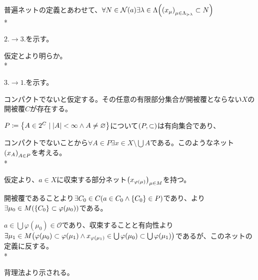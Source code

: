 {  普遍ネットの定義とあわせて、$\forall N \in \mathcal{N}(a) \exists \lambda \in \Lambda \qty(\qty(x_\mu)_{\mu \in \Lambda_{\succcurlyeq \lambda}} \subset N)$\\*

  $2. \rightarrow 3.$を示す。

  仮定とより明らか。\\*

  $3. \rightarrow 1.$を示す。

  コンパクトでないと仮定する。その任意の有限部分集合が開被覆とならない$X$の開被覆$C$が存在する。

  $P \coloneqq \qty{A \in 2^C \mid \abs{A} < \infty \land A \neq \varnothing}$について$\qty(P, \subset)$は有向集合であり、

  コンパクトでないことから$\forall A \in P \exists x \in X \setminus \bigcup A$である。このようなネット$\qty(x_A)_{A \in P}$を考える。\\*

  仮定より、$a \in X$に収束する部分ネット$\qty(x_{\varphi(\mu)})_{\mu \in M}$を持つ。

  開被覆であることより$\exists C_0 \in C \qty(a \in C_0 \land \qty{C_0} \in P)$であり、より$\exists \mu_0 \in M \qty(\qty{C_0} \subset \varphi(\mu_0))$である。

  $a \in \bigcup \varphi(\mu_0) \in \mathcal{O}$であり、収束することと有向性より$\exists \mu_1 \in M \qty(\varphi(\mu_0) \subset \varphi(\mu_1) \land x_{\varphi(\mu_1)} \in \bigcup \varphi(\mu_0) \subset \bigcup \varphi(\mu_1))$であるが、このネットの定義に反する。\\*

  背理法より示される。
}


